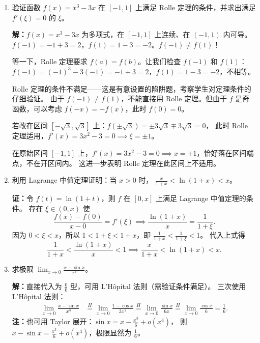 \documentclass[12pt,a4paper]{ctexart}
\begin{document}
\begin{enumerate}[leftmargin=*,label=\arabic*.,start=11]
  \item 验证函数 $f(x) = x^3 - 3x$ 在 $[-1,1]$ 上满足 Rolle 定理的条件，并求出满足 $f'(\xi)=0$ 的 $\xi$。

    \textbf{解：}$f(x) = x^3-3x$ 为多项式，在 $[-1,1]$ 上连续、在 $(-1,1)$ 内可导。
    $f(-1) = -1+3 = 2$，$f(1) = 1-3 = -2$。$f(-1) \neq f(1)$！

    等一下，Rolle 定理要求 $f(a)=f(b)$。让我们检查 $f(-1)$ 和 $f(1)$：
    $f(-1) = (-1)^3 - 3(-1) = -1+3=2$，$f(1)=1-3=-2$，不相等。

    Rolle 定理的条件不满足——这是有意设置的陷阱题，考察学生对定理条件的仔细验证。
    由于 $f(-1) \neq f(1)$，不能直接用 Rolle 定理。但由于 $f$ 是奇函数，可以考虑
    $f(-x) = -f(x)$，此时 $f(0)=0$。

    若改在区间 $[-\sqrt{3}, \sqrt{3}]$ 上：$f(\pm\sqrt{3}) = \pm 3\sqrt{3} \mp 3\sqrt{3} = 0$，
    此时 Rolle 定理适用，$f'(x) = 3x^2-3 = 0 \implies \xi = \pm 1$。

    在原始区间 $[-1,1]$ 上，$f'(x) = 3x^2-3 = 0 \implies x = \pm 1$，恰好落在区间端点，不在开区间内。
    这进一步表明 Rolle 定理在此区间上不适用。

  \item 利用 Lagrange 中值定理证明：当 $x > 0$ 时，
    $\frac{x}{1+x} < \ln(1+x) < x$。

    \textbf{证：}令 $f(t) = \ln(1+t)$，则 $f$ 在 $[0,x]$ 上满足 Lagrange 中值定理的条件。
    存在 $\xi \in (0,x)$ 使
    \[
    \frac{f(x)-f(0)}{x-0} = f'(\xi) \implies \frac{\ln(1+x)}{x} = \frac{1}{1+\xi}.
    \]
    因为 $0 < \xi < x$，所以 $1 < 1+\xi < 1+x$，即 $\frac{1}{1+x} < \frac{1}{1+\xi} < 1$。
    代入上式得
    \[
    \frac{1}{1+x} < \frac{\ln(1+x)}{x} < 1 \implies \frac{x}{1+x} < \ln(1+x) < x.
    \]

  \item 求极限 $\displaystyle\lim_{x\to 0}\frac{x-\sin x}{x^3}$。

    \textbf{解：}直接代入为 $\frac{0}{0}$ 型，可用 L'H\^opital 法则（需验证条件满足）。
    三次使用 L'H\^opital 法则：
    \begin{align*}
      \lim_{x\to 0}\frac{x-\sin x}{x^3}
      &\overset{H}{=} \lim_{x\to 0}\frac{1-\cos x}{3x^2}
      \overset{H}{=} \lim_{x\to 0}\frac{\sin x}{6x}
      \overset{H}{=} \lim_{x\to 0}\frac{\cos x}{6}
      = \frac{1}{6}.
    \end{align*}
    \textbf{注：}也可用 Taylor 展开：$\sin x = x - \frac{x^3}{6} + o(x^4)$，
    则 $x-\sin x = \frac{x^3}{6} + o(x^4)$，极限显然为 $\frac{1}{6}$。


\end{enumerate}
\end{document}
